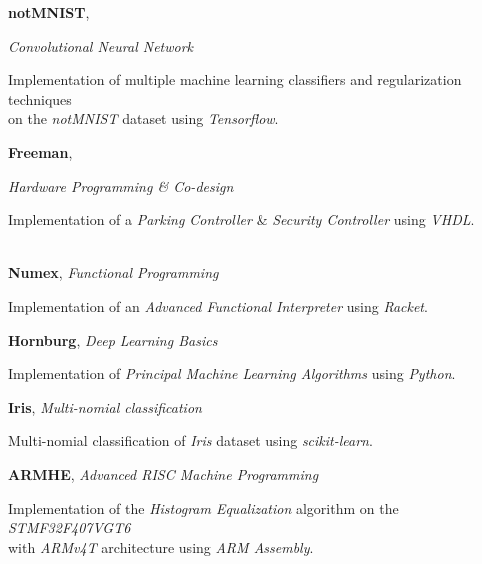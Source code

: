 \documentclass[margin, 10pt]{res} %
\begin{document}
\textbf{notMNIST}, 
{\textit{Convolutional Neural Network}
	\begin{innerlist}
		\item Implementation of multiple machine learning classifiers and regularization techniques\\ on the \textit{notMNIST} dataset using \textit{Tensorflow}. \href{https://github.com/aligholamee/notMNIST}{\hfill{\UrlFont[code]}}
	\end{innerlist}

	\textbf{Freeman}, 
	{\textit{Hardware Programming \& Co-design}
		\begin{innerlist}
			\item Implementation of a \textit{Parking Controller} \& \textit{Security Controller} using \textit{VHDL}.\\ \  \href{https://github.com/aligholamee/Freeman}{\hfill{\UrlFont[code]}}
		\end{innerlist}
		
		\textbf{Numex}, 
		\textit{Functional Programming}
		\begin{innerlist}
			\item Implementation of an \textit{Advanced Functional Interpreter} using \textit{Racket}. \href{https://github.com/aligholamee/NUMEX}{\hfill{\UrlFont[code]}}
		\end{innerlist}
		
		\textbf{Hornburg}, 
		\textit{Deep Learning Basics}
		\begin{innerlist}
			\item Implementation of \textit{Principal Machine Learning Algorithms} using \textit{Python}. \href{https://github.com/aligholamee/Hornburg}{\hfill{\UrlFont[code]}}
		\end{innerlist}
		
		\textbf{Iris}, 
		\textit{Multi-nomial classification}
		\begin{innerlist}
			\item Multi-nomial classification of \textit{Iris} dataset using \textit{scikit-learn}. \href{https://github.com/aligholamee/IRIS}{\hfill{\UrlFont[code]}}
		\end{innerlist}
	
		\textbf{ARMHE}, 
		\textit{Advanced RISC Machine Programming}
		\begin{innerlist}
			\item Implementation of the \textit{Histogram Equalization} algorithm on the \textit{STMF32F407VGT6}\\ with \textit{ARMv4T} architecture using \textit{ARM Assembly}. \href{https://github.com/aligholamee/ARMHE}{\hfill{\UrlFont[code]}}
		\end{innerlist}

}}
\end{document}
